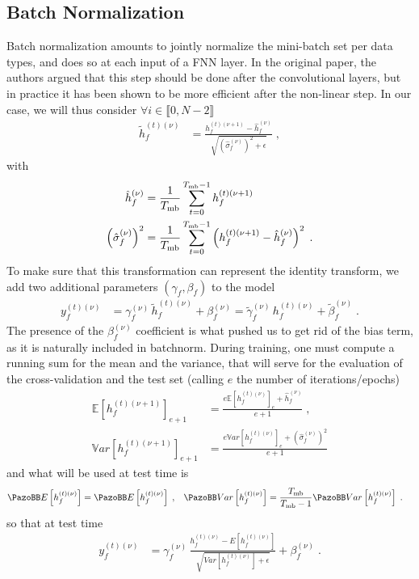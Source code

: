 \subsection{Batch Normalization}

Batch normalization\cite{Ioffe2015} amounts to jointly normalize the mini-batch set per data types, and does so at each input of a FNN layer. In the original paper, the authors argued that this step should be done after the convolutional layers, but in practice it has been shown to be more efficient after the non-linear step. In our case, we will thus consider $\forall i \in \llbracket 0,N-2\rrbracket$
\begin{align}
\tilde{h}_{f}^{(t)(\nu)}&=\frac{h_{f}^{(t)(\nu+1)}-\hat{h}_{f}^{(\nu)}}
%
{\sqrt{\left(\hat{\sigma}_{f}^{(\nu)}\right)^2+\epsilon}}\;,
\end{align}
with
\begin{align}
\hat{h}_{f}^{(\nu)}&=
%
\frac{1}{T_{{\rm mb}}}\sum^{T_{{\rm mb}}-1}_{t=0}h_{f}^{(t)(\nu+1)}\\
%
\left(\hat{\sigma}_{f}^{(\nu)}\right)^2&=\frac{1}{T_{{\rm mb}}}\sum^{T_{{\rm mb}}-1}_{t=0}
%
\left(h_{f}^{(t)(\nu+1)}-\hat{h}_{f}^{(\nu)}\right)^2\;.
\end{align} To make sure that this transformation can represent the identity transform, we add two additional parameters $(\gamma_f,\beta_f)$ to the model
\begin{align}
y^{(t)(\nu)}_{f}&=\gamma^{(\nu)}_f\,\tilde{h}_{f}^{(t)(\nu)}+\beta^{(\nu)}_f
%
=\tilde{\gamma}^{(\nu)}_f\,h_{f}^{(t)(\nu)}+\tilde{\beta}^{(\nu)}_f\;.
\end{align}
The presence of the $\beta^{(\nu)}_f$ coefficient is what pushed us to get rid of the bias term, as it is naturally included in batchnorm. During training, one must compute a running sum for the mean and the variance, that will serve for the evaluation of the cross-validation and the test set (calling $e$ the number of iterations/epochs) 
\begin{align}
\mathbb{E}\left[h_{f}^{(t)(\nu+1)}\right]_{e+1} &=
%
\frac{e\mathbb{E}\left[h_{f}^{(t)(\nu)}\right]_{e}+\hat{h}_{f}^{(\nu)}}{e+1}\;,\\
%
\mathbb{V}ar\left[h_{f}^{(t)(\nu+1)}\right]_{e+1} &=
%
\frac{e\mathbb{V}ar\left[h_{f}^{(t)(\nu)}\right]_{e}+\left(\hat{\sigma}_{f}^{(\nu)}\right)^2}{e+1}
\end{align}
and what will be used at test time is
\begin{align}
\mathbb{E}\left[h_{f}^{(t)(\nu)}\right]&=\mathbb{E}\left[h_{f}^{(t)(\nu)}\right]\;,&
%
\mathbb{V}ar\left[h_{f}^{(t)(\nu)}\right]&=
%
\frac{T_{{\rm mb}}}{T_{{\rm mb}}-1}\mathbb{V}ar\left[h_{f}^{(t)(\nu)}\right]\;.
\end{align}
so that at test time 
\begin{align}
y^{(t)(\nu)}_{f}&=\gamma^{(\nu)}_f\,\frac{h_{f}^{(t)(\nu)}-E[h_{f}^{(t)(\nu)}]}{\sqrt{Var\left[h_{f}^{(t)(\nu)}\right]+\epsilon}}+\beta^{(\nu)}_f\;.
\end{align}


